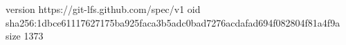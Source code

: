 version https://git-lfs.github.com/spec/v1
oid sha256:1dbce61117627175ba925faca3b5adc0bad7276acdafad694f082804f81a4f9a
size 1373
